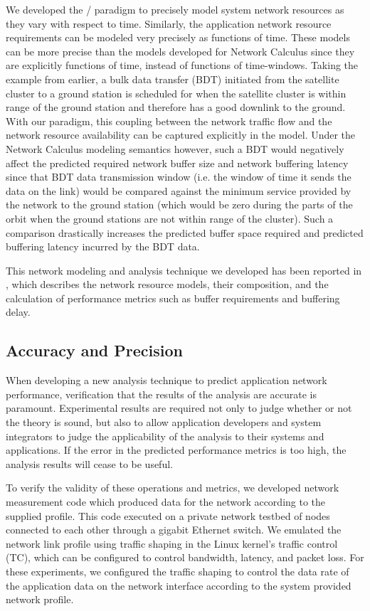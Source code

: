 We developed the \shorttool/ paradigm to precisely
model system network resources as they vary with respect to time.
Similarly, the application network resource requirements can be
modeled very precisely as functions of time.  These models can be more
precise than the models developed for Network Calculus since they are
explicitly functions of time, instead of functions of time-windows.
Taking the example from earlier, a bulk data transfer (BDT) initiated
from the satellite cluster to a ground station is scheduled for when
the satellite cluster is within range of the ground station and
therefore has a good downlink to the ground.  With our paradigm, this
coupling between the network traffic flow and the network resource
availability can be captured explicitly in the model.  Under the
Network Calculus modeling semantics however, such a BDT would
negatively affect the predicted required network buffer size and
network buffering latency since that BDT data transmission window
(i.e. the window of time it sends the data on the link) would be
compared against the minimum service provided by the network to the
ground station (which would be zero during the parts of the orbit when
the ground stations are not within range of the cluster).  Such a
comparison drastically increases the predicted buffer space required
and predicted buffering latency incurred by the BDT data.

This network modeling and analysis technique we developed has been
reported in \cite{ISIS_F6_CYPHY:14}, which describes the network
resource models, their composition, and the calculation of performance
metrics such as buffer requirements and buffering delay.

\subsection{Accuracy and Precision}
\label{subsec:precision}

When developing a new analysis technique to predict application
network performance, verification that the results of the analysis are
accurate is paramount.  Experimental results are required not only to
judge whether or not the theory is sound, but also to allow
application developers and system integrators to judge the
applicability of the analysis to their systems and applications.  If
the error in the predicted performance metrics is too high, the
analysis results will cease to be useful.

To verify the validity of these operations and metrics, we developed
network measurement code which produced data for the network according
to the supplied profile.  This code executed on a private network
testbed of nodes connected to each other through a gigabit Ethernet
switch. We emulated the network link profile using traffic shaping in
the Linux kernel's traffic control (TC)\cite{linux_tc}, which can be
configured to control bandwidth, latency, and packet loss.  For these
experiments, we configured the traffic shaping to control the data
rate of the application data on the network interface according to the
system provided network profile.

